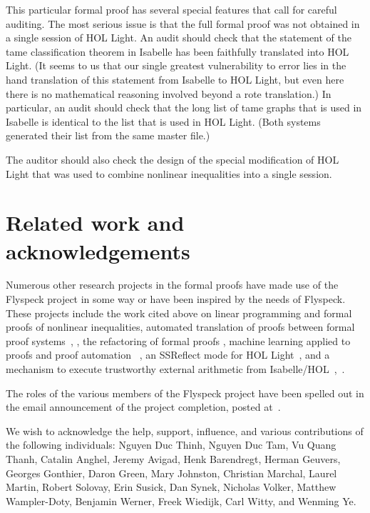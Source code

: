 This particular formal proof has several special features that call for 
careful auditing.  The most serious issue is that the full formal
proof was not obtained in a single session of HOL Light.  An audit
should check that the statement of the tame classification theorem in
Isabelle has been faithfully translated into HOL Light.  (It seems to
us that our single greatest vulnerability to error lies in the hand
translation of this statement from Isabelle to HOL Light, but even here there
is no mathematical reasoning involved beyond a rote translation.)  In
particular, an audit should check that the long list of tame graphs
that is used in Isabelle is identical to the list that is used in HOL
Light.  (Both systems generated their list from the same master file.)

The auditor should also check the
design of the special modification of HOL Light that was used to combine
nonlinear inequalities into a single session.



\section{Related work and acknowledgements}

Numerous other research projects in the formal proofs have made use of
the Flyspeck project in some way or have been inspired by the needs of
Flyspeck.  These projects include the work cited above on linear programming
and formal proofs of nonlinear inequalities, automated translation of proofs
between formal proof systems~\cite{obua:import}, \cite{McLaughlin:2006:IJCAR},
the refactoring of formal proofs \cite{adams2012recording}, machine learning
applied to proofs and proof automation ~\cite{KU14}, an SSReflect mode for HOL Light~\cite{Solovyev-thesis}, and a mechanism to
execute trustworthy external arithmetic from
Isabelle/HOL~\cite{obua:phd},~\cite{ObuaN}.


The roles of the
various members of the Flyspeck project have been spelled out in the email
announcement of the project completion, posted
at~\cite{website:FlyspeckProject}. 

We wish to acknowledge the help, support, influence, and various
contributions of the following individuals:
Nguyen Duc Thinh,  
Nguyen Duc Tam, 
Vu Quang Thanh,
% 
Catalin Anghel, 
Jeremy Avigad, 
Henk Barendregt,
%
Herman Geuvers,
Georges Gonthier,
Daron Green,
Mary Johnston,
Christian Marchal,
Laurel %
Martin, 
%
Robert Solovay,
Erin Susick,
Dan Synek,
Nicholas Volker, 
Matthew Wampler-Doty, 
Benjamin Werner,
Freek Wiedijk, 
Carl Witty, and
Wenming Ye.

